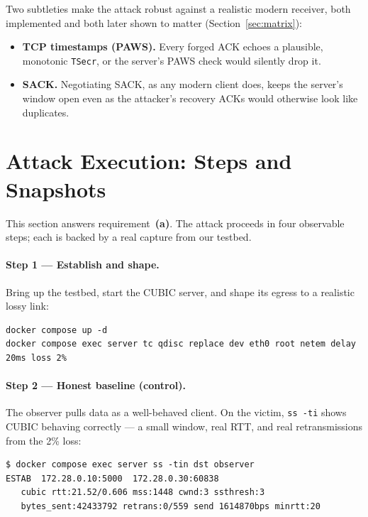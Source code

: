 \documentclass[11pt,a4paper]{article}
\begin{document}
Two subtleties make the attack robust against a realistic modern receiver, both
implemented and both later shown to matter (Section~\ref{sec:matrix}):

\begin{itemize}
  \item \textbf{TCP timestamps (PAWS).} Every forged ACK echoes a plausible, monotonic
        \texttt{TSecr}, or the server's PAWS check would silently drop it.
  \item \textbf{SACK.} Negotiating SACK, as any modern client does, keeps the server's
        window open even as the attacker's recovery ACKs would otherwise look like
        duplicates.
\end{itemize}

\section{Attack Execution: Steps and Snapshots}
\label{sec:steps}

This section answers requirement~\textbf{(a)}. The attack proceeds in four observable
steps; each is backed by a real capture from our testbed.

\paragraph{Step 1 --- Establish and shape.} Bring up the testbed, start the CUBIC server,
and shape its egress to a realistic lossy link:
\begin{lstlisting}[style=codebox]
docker compose up -d
docker compose exec server tc qdisc replace dev eth0 root netem delay 20ms loss 2%
\end{lstlisting}

\paragraph{Step 2 --- Honest baseline (control).} The observer pulls data as a
well-behaved client. On the victim, \texttt{ss -ti} shows CUBIC behaving correctly ---
a small window, real RTT, and real retransmissions from the 2\% loss:
\begin{lstlisting}[style=term]
$ docker compose exec server ss -tin dst observer
ESTAB  172.28.0.10:5000  172.28.0.30:60838
   cubic rtt:21.52/0.606 mss:1448 cwnd:3 ssthresh:3
   bytes_sent:42433792 retrans:0/559 send 1614870bps minrtt:20
\end{lstlisting}
\end{document}

